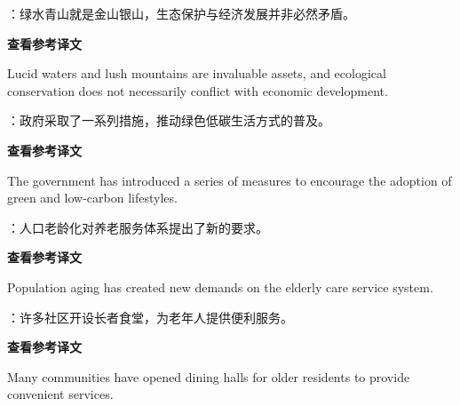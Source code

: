 \documentclass[a4paper,11pt,UTF8,fontset=none]{ctexart}
\begin{document}
\vspace{4pt}

：绿水青山就是金山银山，生态保护与经济发展并非必然矛盾。\par

\noindent\colorbox{HeadBlue}{\strut {\bfseries 查看参考译文}}\par\vspace{1pt}

\noindent Lucid waters and lush mountains are invaluable assets, and ecological conservation does not necessarily conflict with economic development.\par

\vspace{4pt}

：政府采取了一系列措施，推动绿色低碳生活方式的普及。\par

\noindent\colorbox{HeadBlue}{\strut {\bfseries 查看参考译文}}\par\vspace{1pt}

\noindent The government has introduced a series of measures to encourage the adoption of green and low-carbon lifestyles.\par

\vspace{4pt}

：人口老龄化对养老服务体系提出了新的要求。\par

\noindent\colorbox{HeadBlue}{\strut {\bfseries 查看参考译文}}\par\vspace{1pt}

\noindent Population aging has created new demands on the elderly care service system.\par

\vspace{4pt}

：许多社区开设长者食堂，为老年人提供便利服务。\par

\noindent\colorbox{HeadBlue}{\strut {\bfseries 查看参考译文}}\par\vspace{1pt}

\noindent Many communities have opened dining halls for older residents to provide convenient services.\par
\end{document}
